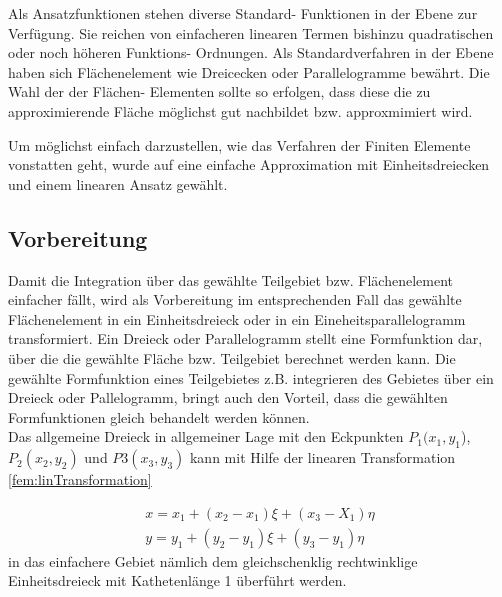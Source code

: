 Als Ansatzfunktionen stehen diverse Standard- Funktionen in der Ebene zur Verfügung. Sie reichen von einfacheren linearen Termen bishinzu quadratischen oder noch höheren Funktions- Ordnungen. Als Standardverfahren in der Ebene haben sich Flächenelement wie Dreicecken oder Parallelogramme bewährt. Die Wahl der  der Flächen- Elementen sollte so erfolgen, dass diese die zu approximierende Fläche möglichst gut nachbildet bzw. approxmimiert wird.

Um möglichst einfach darzustellen, wie das Verfahren der Finiten Elemente vonstatten geht, wurde auf eine einfache Approximation mit Einheitsdreiecken und einem linearen Ansatz gewählt. 

\subsection{Vorbereitung}

Damit die Integration über das gewählte Teilgebiet bzw. Flächenelement einfacher fällt, wird als Vorbereitung im entsprechenden Fall das gewählte Flächenelement in ein Einheitsdreieck oder in ein Eineheitsparallelogramm transformiert. Ein Dreieck oder Parallelogramm stellt eine Formfunktion dar, über die die gewählte Fläche bzw. Teilgebiet berechnet werden kann. Die gewählte Formfunktion eines Teilgebietes z.B. integrieren des Gebietes über ein Dreieck oder Pallelogramm,  bringt auch den Vorteil, dass die gewählten Formfunktionen gleich behandelt werden können. \\
Das allgemeine Dreieck in allgemeiner Lage mit den Eckpunkten $P_1(x_1, y_1$), $ P_2(x_2, y_2)$ und $P3(x_3,y_3)$ kann mit Hilfe der linearen Transformation \eqref{fem:linTransformation}

\begin{equation}
	\begin{split}
		x = x_1 + (x_2 - x_1)\xi + (x_3 - X_1)\eta \\
		y = y_1 + (y_2 - y_1)\xi + (y_3 - y_1)\eta
		\label{fem:linTransformation}
	\end{split}
\end{equation}
in das einfachere Gebiet nämlich dem gleichschenklig rechtwinklige Einheitsdreieck mit Kathetenlänge 1 überführt werden.



